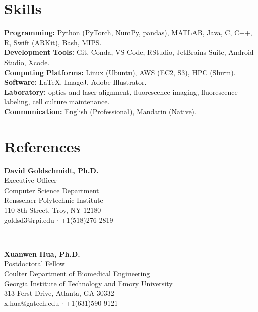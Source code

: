 \documentclass[letterpaper, 11pt]{article}
\begin{document}
\section{Skills}


    \textbf{Programming:} Python (PyTorch, NumPy, pandas), MATLAB, Java, C, C++, R, Swift (ARKit), Bash, MIPS. \\
    \textbf{Development Tools:} Git, Conda, VS Code, RStudio, JetBrains Suite, Android Studio, Xcode. \\
    \textbf{Computing Platforms:} Linux (Ubuntu), AWS (EC2, S3), HPC (Slurm). \\
    \textbf{Software:} LaTeX, ImageJ, Adobe Illustrator. \\
    \textbf{Laboratory:} optics and laser alignment, fluorescence imaging, fluorescence labeling, cell culture maintenance. \\
    \textbf{Communication:} English (Professional), Mandarin (Native).


\section{References}


    \begin{minipage}[t]{0.48\textwidth} 
        \textbf{David Goldschmidt, Ph.D.} \\
        Executive Officer \\
        Computer Science Department \\
        Rensselaer Polytechnic Institute \\
        110 8th Street, Troy, NY 12180 \\
        goldsd3@rpi.edu $\cdot$ +1(518)276-2819
    \end{minipage}%
    \begin{minipage}[t]{0.04\textwidth}
        \
    \end{minipage}%
    \begin{minipage}[t]{0.48\textwidth}
        \textbf{Xuanwen Hua, Ph.D.} \\
        Postdoctoral Fellow \\
        Coulter Department of Biomedical Engineering \\
        Georgia Institute of Technology and Emory University \\
        313 Ferst Drive, Atlanta, GA 30332 \\
        x.hua@gatech.edu $\cdot$ +1(631)590-9121
    \end{minipage}
\end{document}
